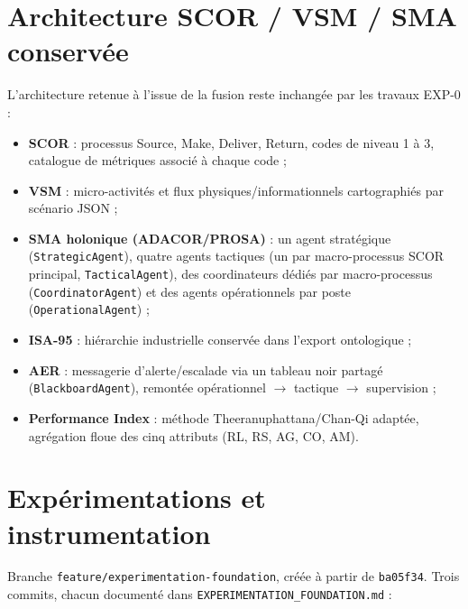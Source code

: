 \documentclass[11pt,a4paper]{article}
\newcommand{\code}[1]{\texttt{#1}}
\begin{document}
\section{Architecture SCOR / VSM / SMA conservée}

L'architecture retenue à l'issue de la fusion reste inchangée par les
travaux EXP-0 :

\begin{itemize}
  \item \textbf{SCOR} : processus Source, Make, Deliver, Return, codes de
        niveau 1 à 3, catalogue de métriques associé à chaque code ;
  \item \textbf{VSM} : micro-activités et flux physiques/informationnels
        cartographiés par scénario JSON ;
  \item \textbf{SMA holonique (ADACOR/PROSA)} : un agent stratégique
        (\code{StrategicAgent}), quatre agents tactiques (un par
        macro-processus SCOR principal, \code{TacticalAgent}), des
        coordinateurs dédiés par macro-processus (\code{CoordinatorAgent})
        et des agents opérationnels par poste (\code{OperationalAgent}) ;
  \item \textbf{ISA-95} : hiérarchie industrielle conservée dans l'export
        ontologique ;
  \item \textbf{AER} : messagerie d'alerte/escalade via un tableau noir
        partagé (\code{BlackboardAgent}), remontée opérationnel $\to$
        tactique $\to$ supervision ;
  \item \textbf{Performance Index} : méthode Theeranuphattana/Chan-Qi
        adaptée, agrégation floue des cinq attributs (RL, RS, AG, CO, AM).
\end{itemize}

\section{Expérimentations et instrumentation}
\label{sec:exp0}

Branche \code{feature/experimentation-foundation}, créée à partir de
\code{ba05f34}. Trois commits, chacun documenté dans
\code{EXPERIMENTATION\_FOUNDATION.md} :
\end{document}
